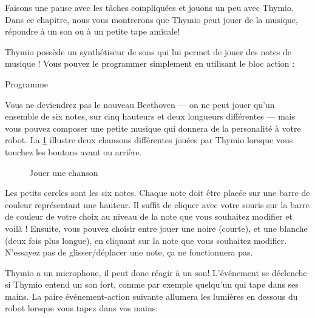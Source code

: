 \label{ch.bells}

Faisons une pause avec les tâches compliquées et jouons un peu avec Thymio.
Dans ce chapitre, nous vous montrerons que Thymio peut jouer de la musique, répondre à un son ou à un petite tape amicale!


Thymio possède un synthétiseur de sons qui lui permet de jouer des notes de musique !
Vous pouvez le programmer simplement en utilisant le bloc action :

{\raggedleft \hfill Programme }

Vous ne deviendrez pas le nouveau Beethoven --- on ne peut jouer qu'un ensemble de six notes, sur cinq hauteurs et deux longueurs différentes --- mais vous pouvez composer une petite musique qui donnera de la personalité à votre robot.
La \cref{fig.music} illustre deux chansons différentes jouées par Thymio lorsque vous touchez les boutons avant ou arrière.

\begin{figure}
\begin{center}
\caption{Jouer une chanson}\label{fig.music}
\end{center}
\end{figure}

Les petits cercles sont les six notes.
Chaque note doit être placée sur une barre de couleur représentant une hauteur.
Il suffit de cliquer avec votre souris sur la barre de couleur de votre choix au niveau de la note que vous souhaitez modifier et voilà !
Ensuite, vous pouvez choisir entre jouer une noire (courte), et une blanche (deux fois plus longue), en cliquant sur la note que vous souhaitez modifier.
N'essayez pas de glisser/déplacer une note, ça ne fonctionnera pas.





Thymio a un microphone, il peut donc réagir à un son! L'événement  se déclenche si Thymio entend un son fort, comme par exemple quelqu'un qui tape dans ses mains.
La paire événement-action suivante allumera les lumières en dessous du robot lorsque vous tapez dans vos mains: 


